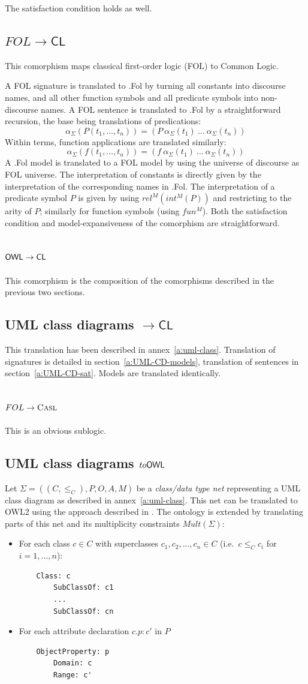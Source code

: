 \documentclass[10pt,fleqn,final]{scrreprt}
\newcommand*{\CL}{\ensuremath{\mathsf{CL}}\xspace}
\newcommand{\ssclause}[1]{\subsection{#1}}
\newenvironment{definitions}[0]{\medskip }{}
\begin{document}
\begin{definitions}
	The satisfaction condition holds as well.

\ssclause{$FOL \rightarrow \CL$}

This comorphism  maps classical first-order logic (FOL) to Common Logic.


A FOL signature is translated to \Clogic.Fol by turning all constants
into discourse names, and all other function symbols and all predicate
symbols into non-discourse names. A FOL sentence is translated
to \Clogic.Fol by a straightforward recursion, the base being translations
of predications:
$$\alpha_\Sigma(P(t_1,\ldots,t_n)) = (P\ \alpha_\Sigma(t_1)\ \ldots\ \alpha_\Sigma(t_n))$$
Within terms, function applications are translated similarly:
$$\alpha_\Sigma(f(t_1,\ldots,t_n)) = (f\ \alpha_\Sigma(t_1)\ \ldots\ \alpha_\Sigma(t_n))$$
A \Clogic.Fol model is translated to a FOL model by using the universe of
discourse as FOL universe. The interpretation of constants is
directly given by the interpretation of the corresponding names
in \Clogic.Fol. The interpretation of a predicate symbol $P$ is given
by using $rel^M(int^M(P))$ and restricting to the arity of $P$;
similarly for function symbols (using $fun^M$). Both the satisfaction condition
and model-expansiveness of the comorphism are straightforward.

\ssclause{$\OWL \rightarrow \CL$}

This comorphism is the composition of the comorphisms described in the previous
two sections.

\ssclause{UML class diagrams $\to \CL$}
This translation has been described in annex~\ref{a:uml-class}. 
Translation of signatures is detailed in section~\ref{a:UML-CD-models},
translation of sentences in section~\ref{a:UML-CD-sat}.
Models are translated identically.

\ssclause{$FOL \to \textmd{\textsc{Casl}}$}
This is an obvious sublogic.

 

\ssclause{UML class diagrams $to \mathsf{OWL}$}
Let $\Sigma = ((C, {\leq_C}), P, O, A, M)$ be a \emph{class/data type net} representing a UML class diagram as described in annex~\ref{a:uml-class}. This net can be translated to OWL2 using the approach described in \cite{zedlitz2012uml}.
The ontology is extended by translating parts of this net and its multiplicity constraints $\mathit{Mult}(\Sigma)$:
\begin{itemize}
\item For each class $c \in C$ with superclasses $c_1,c_2,...,c_n \in C$ (i.e.\ $c \leq_C c_i$ for $i=1,...,n$):
\begin{lstlisting} 
	Class: c
		SubClassOf: c1
		...
		SubClassOf: cn
\end{lstlisting}
\item For each attribute declaration $c.p:c'$ in $P$
\begin{lstlisting}
	ObjectProperty: p
		Domain: c
		Range: c'
\end{lstlisting}


\end{itemize}
\end{definitions}
\end{document}
